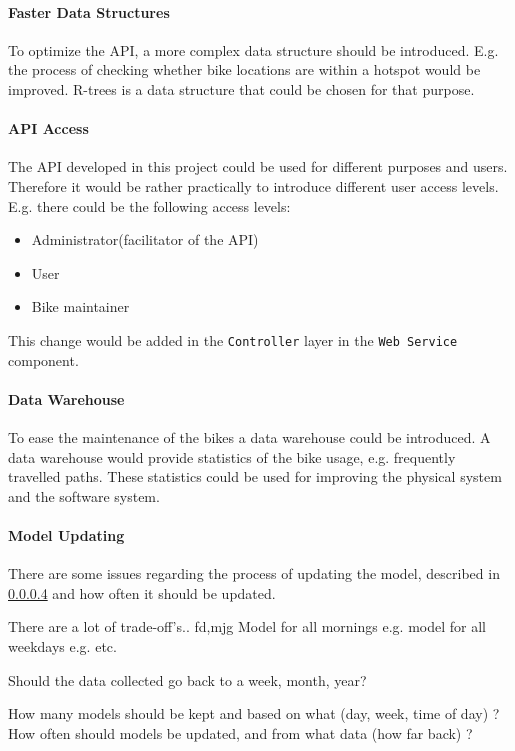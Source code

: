 \paragraph{Faster Data Structures}
To optimize the API, a more complex data structure should be introduced.
E.g. the process of checking whether bike locations are within a hotspot would be improved.
R-trees\cite[Section 25.3.5.3]{database_system_concepts} is a data structure that could be chosen for that purpose.

\paragraph{API Access}
The API developed in this project could be used for different purposes and users.
Therefore it would be rather practically to introduce different user access levels.
E.g. there could be the following access levels:
\begin{itemize}
\item Administrator(facilitator of the API)
\item User
\item Bike maintainer
\end{itemize}
This change would be added in the \texttt{Controller} layer in the \texttt{Web Service} component.

\paragraph{Data Warehouse \cite{data_warehousing}}
To ease the maintenance of the bikes a data warehouse could be introduced.
A data warehouse would provide statistics of the bike usage, e.g. frequently travelled paths.
These statistics could be used for improving the physical system and the software system.

\paragraph{Model Updating}
There are some issues regarding the process of updating the model, described in \cref{} and how often it should be updated.

There are a lot of trade-off's.. fd,mjg  
Model for all mornings e.g.
model for all weekdays e.g.
etc.

Should the data collected go back to a week, month, year?

How many models should be kept and based on what (day, week, time of day) ? How often should models be updated, and from what data (how far back) ?

